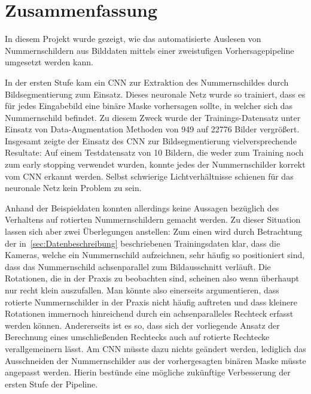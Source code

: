 \section{Zusammenfassung}
\label{sec:zusammenfassung}

In diesem Projekt wurde gezeigt, wie das automatisierte Auslesen
von Nummernschildern aus Bilddaten mittels einer zweistufigen
Vorhersagepipeline umgesetzt werden kann.

In der ersten Stufe kam ein CNN zur Extraktion des Nummernschildes durch
Bildsegmentierung zum Einsatz.
Dieses neuronale Netz wurde so trainiert, dass es f\"ur jedes
Eingabebild eine bin\"are Maske vorhersagen sollte, in welcher
sich das Nummernschild befindet.
Zu diesem Zweck wurde der Trainings-Datensatz unter
Einsatz von Data-Augmentation Methoden von 949 auf 22776 Bilder
vergr\"o{\ss}ert.
Insgesamt zeigte der Einsatz des CNN zur Bildsegmentierung vielversprechende
Resultate: Auf einem Testdatensatz von 10 Bildern, die weder zum Training
noch zum early stopping verwendet wurden, konnte jedes der Nummernschilder
korrekt vom CNN erkannt werden. Selbst schwierige Lichtverh\"altnisse schienen
f\"ur das neuronale Netz kein Problem zu sein.

Anhand der Beispieldaten konnten allerdings keine Aussagen bez\"uglich
des Verhaltens auf rotierten Nummernschildern gemacht werden.
Zu dieser Situation lassen sich aber zwei \"Uberlegungen anstellen:
Zum einen wird durch Betrachtung der in~\ref{sec:Datenbeschreibung}
beschriebenen Trainingsdaten klar, dass die Kameras, welche ein Nummernschild
aufzeichnen, sehr h\"aufig so positioniert sind, dass das Nummernschild
achsenparallel zum Bildausschnitt verl\"auft. Die Rotationen, die in der
Praxis zu beobachten sind, scheinen also wenn \"uberhaupt nur recht
klein auszufallen. Man k\"onnte also einerseits argumentieren, dass
rotierte Nummernschilder in der Praxis nicht h\"aufig auftreten und dass
kleinere Rotationen immernoch hinreichend durch ein achsenparalleles
Rechteck erfasst werden k\"onnen.
Andererseits ist es so, dass sich der vorliegende Ansatz der
Berechnung eines umschlie{\ss}enden Rechtecks auch auf rotierte
Rechtecke verallgemeinern l\"asst. Am CNN m\"usste dazu nichts ge\"andert
werden, lediglich das Ausschneiden der Nummernschilder aus der
vorhergesagten bin\"aren Maske m\"usste
angepasst werden. Hierin best\"unde eine m\"ogliche zuk\"unftige
Verbesserung der ersten Stufe der Pipeline.

